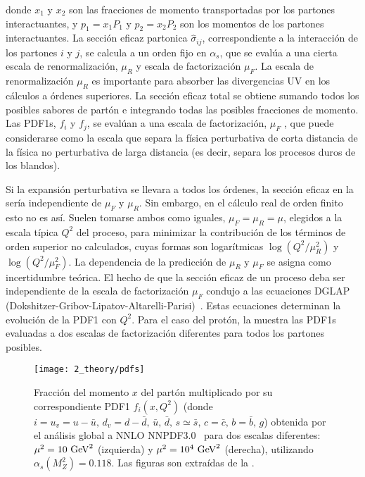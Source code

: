 donde \(x_1\) y \(x_2\) son las fracciones de momento transportadas por los partones interactuantes, y \(p_1 = x_1 P_1\) y \(p_2 = x_2 P_2\) son los momentos de los partones interactuantes. La sección eficaz partonica \(\hat{\sigma}_{ij}\), correspondiente a la interacción de los partones \(i\) y \(j\), se calcula a un orden fijo en \(\alpha_s\), que se evalúa a una cierta escala de renormalización, \(\mu_R\) y escala de factorización \(\mu_F\). La escala de renormalización \(\mu_R\) es importante para absorber las divergencias \ac{UV} en los cálculos a órdenes superiores. La sección eficaz total se obtiene sumando todos los posibles sabores de part\'on e integrando todas las posibles fracciones de momento. Las \acp{PDF1}, \(f_i\) y \(f_j\), se evalúan a una escala de factorización, \(\mu_F\) , que puede considerarse como la escala que separa la física perturbativa de corta distancia de la física no perturbativa de larga distancia (es decir, separa los procesos duros de los blandos).

Si la expansión perturbativa se llevara a todos los órdenes, la sección eficaz en la \Eqn{\ref{eq:theory:sm:hadron_interactions:xs}} sería independiente de \(\mu_F\) y \(\mu_R\). Sin embargo, en el cálculo real de orden finito esto no es así. Suelen tomarse ambos como iguales, \(\mu_F = \mu_R = \mu\), elegidos a la escala típica \(Q^2\) del proceso, para minimizar la contribución de los términos de orden superior no calculados, cuyas formas son logarítmicas \(\log\left(Q^2/\mu_R^2\right)\) y \(\log\left(Q^2/\mu_F^2\right)\). La dependencia de la predicción de \(\mu_R\) y \(\mu_F\) se asigna como incertidumbre teórica. El hecho de que la sección eficaz de un proceso deba ser independiente de la escala de factorización \(\mu_F\) condujo a las ecuaciones DGLAP (Dokshitzer-Gribov-Lipatov-Altarelli-Parisi)~\cite{Dokshitzer-1977,Gribov_Lipatov-1971,Altarelli_Parisi-1977}. Estas ecuaciones determinan la evolución de la \ac{PDF1} con \(Q^2\).
Para el caso del protón, la \Fig{\ref{fig:theory:sm:hadron_interactions:pdfs}} muestra las \acp{PDF1} evaluadas a dos escalas de factorización diferentes para todos los partones posibles.

\begin{figure}[ht!]
    \centering
    \texttt{[image: 2\_theory/pdfs]}
    \caption{Fracci\'on del momento \(x\) del part\'on multiplicado por su correspondiente \acs{PDF1} \(f_i(x, Q^2)\) (donde \(i = u_v = u - \bar{u}, \, d_v = d - \bar{d},\, \bar{u},\, \bar{d},\, s\simeq\bar{s},\, c=\bar{c},\, b=\bar{b},\, g \)) obtenida por el an\'alisis global a \ac{NNLO} NNPDF3.0~\cite{NNPDF} para dos escalas diferentes: \(\mu^2 = 10~\text{GeV}^2\) (izquierda) y \(\mu^2 = 10^4~\text{GeV}^2\) (derecha), utilizando \(\alpha_s(M_Z^2) = 0.118\). Las figuras son extra\'idas de la .}
    \label{fig:theory:sm:hadron_interactions:pdfs}
\end{figure}




